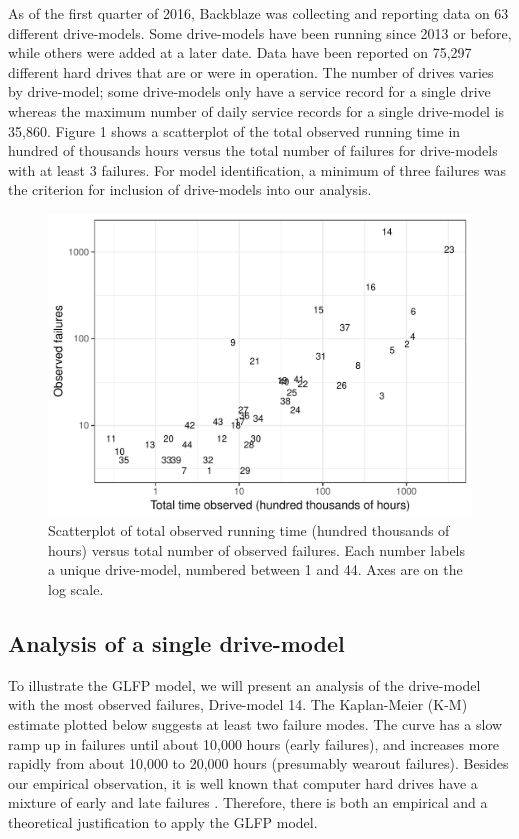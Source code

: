 \documentclass[12pt]{article}
\begin{document}
As of the first quarter of 2016, Backblaze was collecting and reporting data on 63 different drive-models.  Some drive-models have been running since 2013 or before, while others were added at a later date.  Data have been reported on 75,297 different hard drives that are or were in operation.  The number of drives varies by drive-model; some drive-models only have a service record for a single drive whereas the maximum number of daily service records for a single drive-model is 35,860.  Figure 1 shows a scatterplot of the total observed running time in hundred of thousands hours versus the total number of failures for drive-models with at least 3 failures.  For model identification, a minimum of three failures was the criterion for inclusion of drive-models into our analysis.  

\begin{figure}[H]
  \includegraphics[width=.9\textwidth]{dm-summ-scatter.pdf}
  \caption{Scatterplot of total observed running time (hundred thousands of hours) versus total number of observed failures.  Each number labels a unique drive-model, numbered between 1 and 44.   Axes are on the log scale.}
  \label{drive-scatter}
\end{figure}

\subsection{Analysis of a single drive-model}
\label{subsec:ex1}
To illustrate the GLFP model, we will present an analysis of the drive-model with the most observed failures, Drive-model 14.  The Kaplan-Meier (K-M) estimate plotted below suggests at least two failure modes.  The curve has a slow ramp up in failures until about 10,000 hours (early failures), and increases more rapidly from about 10,000 to 20,000 hours (presumably wearout failures).  Besides our empirical observation, it is well known that computer hard drives have a mixture of early and late failures \citep{chan}.  Therefore, there is both an empirical and a theoretical justification to apply the GLFP model.
\end{document}
